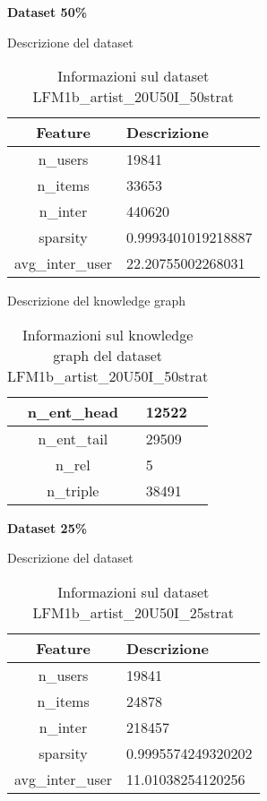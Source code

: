\noindent\textbf{Dataset 50\%}

\noindent Descrizione del dataset
\begin{table}[H]
    \centering
    \footnotesize
    \begin{tabularx}{\textwidth}{|c|X|}
        \hline
        \textbf{Feature} & \textbf{Descrizione} \\
        \hline
        n\_users & 19841 \\
        \hline
        n\_items & 33653 \\
        \hline
        n\_inter & 440620 \\
        \hline
        sparsity &  0.9993401019218887 \\
        \hline
        avg\_inter\_user & 22.20755002268031 \\
        \hline
    \end{tabularx}
    \caption{Informazioni sul dataset LFM1b\_artist\_20U50I\_50strat}
    \label{tab:dataset_info}
\end{table}


\noindent Descrizione del knowledge graph
\begin{table}[H]
    \centering
    \footnotesize
    \begin{tabularx}{\textwidth}{|c|X|}
        \hline
        n\_ent\_head & 12522 \\
        \hline
        n\_ent\_tail & 29509 \\
        \hline
        n\_rel & 5 \\
        \hline
        n\_triple & 38491 \\
        \hline
    \end{tabularx}
    \caption{Informazioni sul knowledge graph del dataset LFM1b\_artist\_20U50I\_50strat}
    \label{tab:dataset_info}
\end{table}

\noindent\textbf{Dataset 25\%}

\noindent Descrizione del dataset
\begin{table}[H]
    \centering
    \footnotesize
    \begin{tabularx}{\textwidth}{|c|X|}
        \hline
        \textbf{Feature} & \textbf{Descrizione} \\
        \hline
        n\_users & 19841 \\
        \hline
        n\_items & 24878 \\
        \hline
        n\_inter & 218457 \\
        \hline
        sparsity & 0.9995574249320202 \\
        \hline
        avg\_inter\_user & 11.01038254120256 \\
        \hline
    \end{tabularx}
    \caption{Informazioni sul dataset LFM1b\_artist\_20U50I\_25strat}
    \label{tab:dataset_info}
\end{table}


